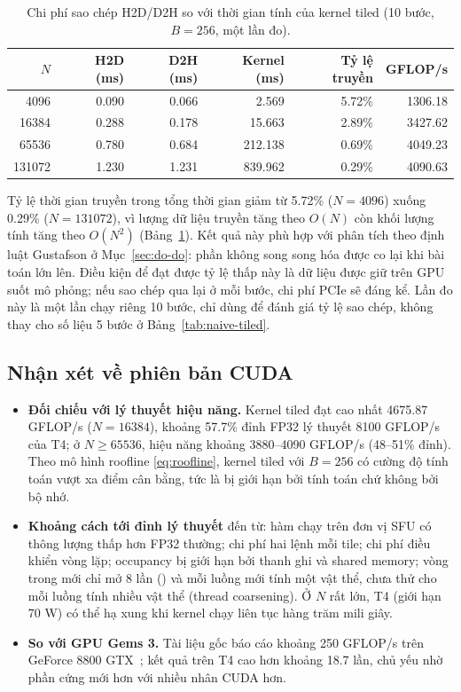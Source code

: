 \begin{table}[H]
\centering\small
\begin{tabular}{rrrrrr}
\toprule
\textbf{$N$} & \textbf{H2D (ms)} & \textbf{D2H (ms)} & \textbf{Kernel (ms)} & \textbf{Tỷ lệ truyền} & \textbf{GFLOP/s} \\
\midrule
4096 & 0.090 & 0.066 & 2.569 & 5.72\% & 1306.18 \\
16384 & 0.288 & 0.178 & 15.663 & 2.89\% & 3427.62 \\
65536 & 0.780 & 0.684 & 212.138 & 0.69\% & 4049.23 \\
131072 & 1.230 & 1.231 & 839.962 & 0.29\% & 4090.63 \\
\bottomrule
\end{tabular}
\caption{Chi phí sao chép H2D/D2H so với thời gian tính của kernel tiled (10 bước, $B=256$, một lần đo).}
\label{tab:h2d}
\end{table}

Tỷ lệ thời gian truyền trong tổng thời gian giảm từ 5.72\% ($N=4096$) xuống 0.29\% ($N=131072$), vì lượng dữ liệu truyền tăng theo $O(N)$ còn khối lượng tính tăng theo $O(N^2)$ (Bảng~\ref{tab:h2d}). Kết quả này phù hợp với phân tích theo định luật Gustafson ở Mục~\ref{sec:do-do}: phần không song song hóa được co lại khi bài toán lớn lên. Điều kiện để đạt được tỷ lệ thấp này là dữ liệu được giữ trên GPU suốt mô phỏng; nếu sao chép qua lại ở mỗi bước, chi phí PCIe sẽ đáng kể. Lần đo này là một lần chạy riêng 10 bước, chỉ dùng để đánh giá tỷ lệ sao chép, không thay cho số liệu 5 bước ở Bảng~\ref{tab:naive-tiled}.

\subsection{Nhận xét về phiên bản CUDA}

\begin{itemize}
\item \textbf{Đối chiếu với lý thuyết hiệu năng.} Kernel tiled đạt cao nhất 4675.87 GFLOP/s ($N=16384$), khoảng 57.7\% đỉnh FP32 lý thuyết 8100 GFLOP/s của T4; ở $N \ge 65536$, hiệu năng khoảng 3880--4090 GFLOP/s (48--51\% đỉnh). Theo mô hình roofline \eqref{eq:roofline}, kernel tiled với $B=256$ có cường độ tính toán vượt xa điểm cân bằng, tức là bị giới hạn bởi tính toán chứ không bởi bộ nhớ.
\item \textbf{Khoảng cách tới đỉnh lý thuyết} đến từ: hàm  chạy trên đơn vị SFU có thông lượng thấp hơn FP32 thường; chi phí hai lệnh  mỗi tile; chi phí điều khiển vòng lặp; occupancy bị giới hạn bởi thanh ghi và shared memory; vòng trong mới chỉ mở 8 lần () và mỗi luồng mới tính một vật thể, chưa thử cho mỗi luồng tính nhiều vật thể (thread coarsening). Ở $N$ rất lớn, T4 (giới hạn 70 W) có thể hạ xung khi kernel chạy liên tục hàng trăm mili giây.
\item \textbf{So với GPU Gems 3.} Tài liệu gốc báo cáo khoảng 250 GFLOP/s trên GeForce 8800 GTX~\cite{gpugems3}; kết quả trên T4 cao hơn khoảng 18.7 lần, chủ yếu nhờ phần cứng mới hơn với nhiều nhân CUDA hơn.
\end{itemize}

